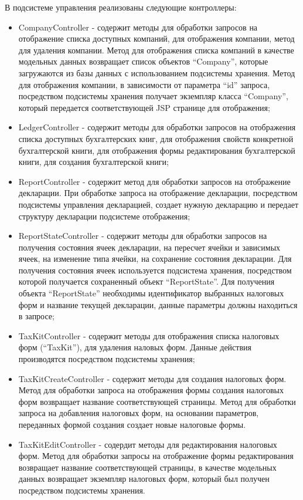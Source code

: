 \documentclass[14pt,a4paper]{reportmod}
\begin{document}
В подсистеме управления реализованы следующие контроллеры:
\begin{itemize}
  \item CompanyController - содержит методы для обработки запросов на отображение списка доступных компаний, для отображения компании, метод для удаления компании. Метод для отображения списка компаний в качестве модельных данных возвращает список объектов ``Company'', которые загружаются из базы данных с использованием подсистемы хранения. Метод для отображения компании, в зависимости от параметра ``id'' запроса, посредством подсистемы хранения получает экземпляр класса ``Company'', который передается соответствующей JSP странице для отображения;
  \item LedgerController - содержит методы для обработки запросов на отображения списка доступных бухгалтерских книг, для отображения свойств конкретной бухгалтерской книги, для отображения формы редактирования бухгалтерской книги, для создания бухгалтерской книги;
  \item ReportController - содержит метод для обработки запросов на отображение декларации. При обработке запроса на отображение декларации, посредством подсистемы управления декларацией, создает нужную декларацию и передает структуру декларации подсистеме отображения;
  \item ReportStateController - содержит методы для обработки запросов на получения состояния ячеек декларации, на пересчет ячейки и зависимых ячеек, на изменение типа ячейки, на сохранение состояния декларации. Для получения состояния ячеек используется подсистема хранения, посредством которой получается сохраненный объект ``ReportState''. Для получения объекта ``ReportState'' необходимы идентификатор выбранных налоговых форм и название текущей декларации, данные параметры должны находиться в запросе;
  \item TaxKitController - содержит методы для отображения списка налоговых форм (``TaxKit''), для удаления наловых форм. Данные действия производятся посредством подсистемы хранения;
  \item TaxKitCreateController - содержит методы для создания налоговых форм. Метод для обработки запроса на отображения формы создания налоговых форм возвращает название соответствующей страницы. Метод для обработки запроса на добавления налоговых форм, на основании параметров, переданных формой создания создает новые налоговые формы.
  \item TaxKitEditController - содердит методы для редактирования налоговых форм. Метод для обработки запросы на отображение формы редактирования возвращает название соответствующей страницы, в качестве модельных данных возвращает экземпляр налоговых форм, который был получен посредством подсистемы хранения.
\end{itemize}
\end{document}
